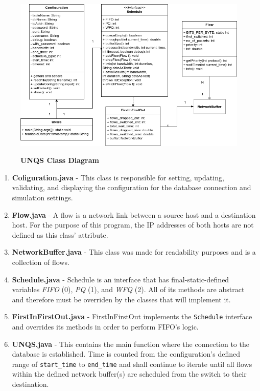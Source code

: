 \documentclass[journal]{IEEE/IEEEtran}
\begin{document}
\begin{figure}
\includegraphics[width=\textwidth]{UNQS_UML}
\label{fig:uml}\caption{\textbf{UNQS Class Diagram}}
\end{figure}

\begin{enumerate}
\item \textbf{Cofiguration.java} - This class is responsible for setting, updating, validating, and displaying the configuration for the database connection and simulation settings.

\item \textbf{Flow.java} - A flow is a network link between a source host and a destination host. For the purpose of this program, the IP addresses of both hosts are not defined as this class' attribute.

\item \textbf{NetworkBuffer.java} - This class was made for readability purposes and is a collection of flows.

\item \textbf{Schedule.java} - Schedule is an interface that has final-static-defined variables \textit{FIFO} (0), \textit{PQ} (1), and \textit{WFQ} (2). All of its methods are abstract and therefore must be overriden by the classes that will implement it.

\item \textbf{FirstInFirstOut.java} - FirstInFirstOut implements the \texttt{Schedule} interface and overrides its methods in order to perform FIFO's logic.

\item \textbf{UNQS.java} - This contains the main function where the connection to the database is established. Time is counted from the configuration's defined range of \texttt{start\_time} to \texttt{end\_time} and shall continue to iterate until all flows within the defined network buffer(s) are scheduled from the switch to their destination.
\end{enumerate}
\end{document}
